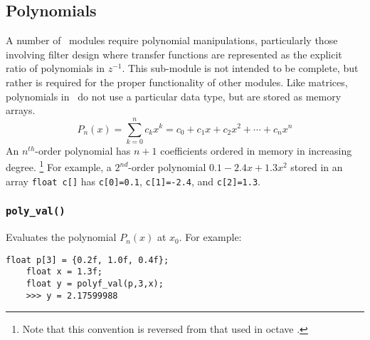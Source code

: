 \subsection{Polynomials}
\label{module:math:poly}
A number of \liquid\ modules require polynomial manipulations, particularly
those involving filter design where transfer functions are represented as the
explicit ratio of polynomials in $z^{-1}$.
This sub-module is not intended to be complete, but rather is required for
the proper functionality of other modules.
Like matrices, polynomials in \liquid\ do not use a particular data type, but
are stored as memory arrays.
%
\begin{equation}
\label{eqn:math:poly:representation}
    P_n(x) = \sum_{k=0}^{n}{c_k x^k}
           = c_0 + c_1 x + c_2 x^2 + \cdots + c_n x^n
\end{equation}
%
An $n^{th}$-order polynomial has $n+1$ coefficients ordered in memory in
increasing degree.%
\footnote{Note that this convention is reversed from that used in octave
\cite{octave:web}.}
For example, a $2^{nd}$-order polynomial $0.1 -2.4x + 1.3x^2$ stored in an
array {\tt float c[]} has
{\tt c[0]=0.1},
{\tt c[1]=-2.4}, and
{\tt c[2]=1.3}.

\subsubsection{{\tt poly\_val()}}
\label{module:math:poly:polyf_val}
Evaluates the polynomial $P_n(x)$ at $x_0$.
For example:
\begin{Verbatim}[fontsize=\small]
    float p[3] = {0.2f, 1.0f, 0.4f};
    float x = 1.3f;
    float y = polyf_val(p,3,x);
    >>> y = 2.17599988
\end{Verbatim}

